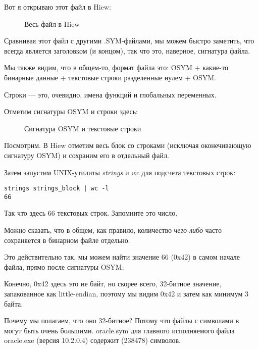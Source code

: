 \clearpage
Вот я открываю этот файл в Hiew:

\begin{figure}[H]
\centering
{}
\caption{Весь файл в Hiew}
\label{fig:oracle_SYM_whole1}
\end{figure}

Сравнивая этот файл с другими .SYM-файлами, мы можем быстро заметить, что  всегда является
заголовком (и концом), так что это, наверное, сигнатура файла.

Мы также видим, что в общем-то, формат файла это: OSYM + какие-то бинарные данные + 
текстовые строки разделенные нулем + OSYM.

Строки --- это, очевидно, имена функций и глобальных переменных.

\clearpage
Отметим сигнатуры OSYM и строки здесь: 

\begin{figure}[H]
\centering
{}
\caption{Сигнатура OSYM и текстовые строки}
\label{fig:oracle_SYM_whole2}
\end{figure}

Посмотрим. 
В Hiew отметим весь блок со строками (исключая оконечивающую сигнатуру OSYM) и сохраним его в отдельный
файл.

Затем запустим UNIX-утилиты \emph{strings} и \emph{wc} для подсчета текстовых строк:%

\begin{lstlisting}
strings strings_block | wc -l
66
\end{lstlisting}

Так что здесь 66 текстовых строк.  Запомните это число.

Можно сказать, что в общем, как правило, количество \emph{чего-либо} часто сохраняется в бинарном
файле отдельно.

Это действительно так, мы можем найти значение 66 (0x42) в самом начале файла, прямо после сигнатуры OSYM:



Конечно, 0x42 здесь это не байт, но скорее всего, 32-битное значение, запакованное как little-endian,
поэтому мы видим 0x42 и затем как минимум 3 байта.

Почему мы полагаем, что оно 32-битное?
Потому что файлы с символами в \oracle могут быть очень большими.
oracle.sym для главного исполняемого файла oracle.exe (версия 10.2.0.4) содержит  (238478) 
символов.

